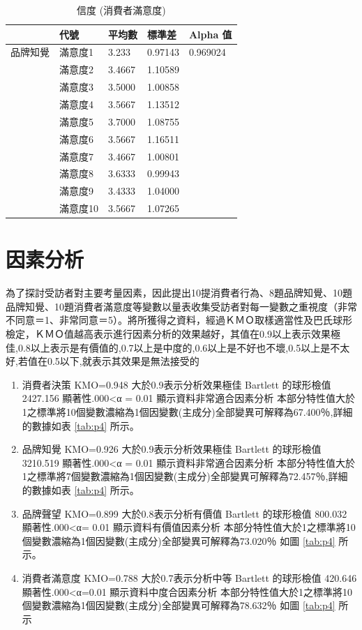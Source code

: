 \begin{table}[htb]
\caption{信度 (消費者滿意度)}
\label{tab:e4}
\renewcommand{\arraystretch}{1.2} %
\arrayrulewidth=1pt               %
\tabcolsep=18pt                   %
\begin{tabular}[t]{lllll}  %
\hline
 & 代號& 平均數 & 標準差&  Alpha 值  \\
\hline
品牌知覺 & 滿意度1&3.233&0.97143&0.969024\\
              & 滿意度2&3.4667&1.10589&  \\
             & 滿意度3&3.5000&1.00858&  \\
             & 滿意度4&3.5667&1.13512&\\
             & 滿意度5&3.7000&1.08755&  \\
             & 滿意度6&3.5667&1.16511&\\
             & 滿意度7&3.4667&1.00801&  \\
             & 滿意度8&3.6333&0.99943&  \\
             & 滿意度9&3.4333&1.04000&\\
             & 滿意度10&3.5667&1.07265&\\
\hline
\end{tabular}
\end{table}

\section{因素分析}
為了探討受訪者對主要考量因素，因此提出10提消費者行為、8題品牌知覺、10題品牌知覺、10題消費者滿意度等變數以量表收集受訪者對每一變數之重視度（非常不同意＝1、非常同意＝5）。將所獲得之資料，經過ＫＭＯ取樣適當性及巴氏球形檢定，ＫＭＯ值越高表示進行因素分析的效果越好，其值在0.9以上表示效果極佳,0.8以上表示是有價值的,0.7以上是中度的,0.6以上是不好也不壞,0.5以上是不太好,若值在0.5以下,就表示其效果是無法接受的
\begin{enumerate}
\item 消費者決策
KMO=0.948 大於0.9表示分析效果極佳 Bartlett 的球形檢值 2427.156 顯著性.000<α = 0.01 顯示資料非常適合因素分析  本部分特性值大於1之標準將10個變數濃縮為1個因變數(主成分)全部變異可解釋為67.400％,詳細的數據如表  \ref{tab:p4} 所示。
\item 品牌知覺
KMO=0.926 大於0.9表示分析效果極佳 Bartlett 的球形檢值 3210.519 顯著性.000<α = 0.01 顯示資料非常適合因素分析  本部分特性值大於1之標準將7個變數濃縮為1個因變數(主成分)全部變異可解釋為72.457％,詳細的數據如表  \ref{tab:p4} 所示。
\item 品牌聲望
KMO=0.899 大於0.8表示分析有價值 Bartlett 的球形檢值 800.032 顯著性.000<α= 0.01 顯示資料有價值因素分析  本部分特性值大於1之標準將10個變數濃縮為1個因變數(主成分)全部變異可解釋為73.020％ 如圖 \ref{tab:p4}  所示。
\item 消費者滿意度
KMO=0.788 大於0.7表示分析中等 Bartlett 的球形檢值 420.646 顯著性.000<α=0.01 顯示資料中度合因素分析  本部分特性值大於1之標準將10個變數濃縮為1個因變數(主成分)全部變異可解釋為78.632％ 如圖 \ref{tab:p4} 所示
\end{enumerate}


